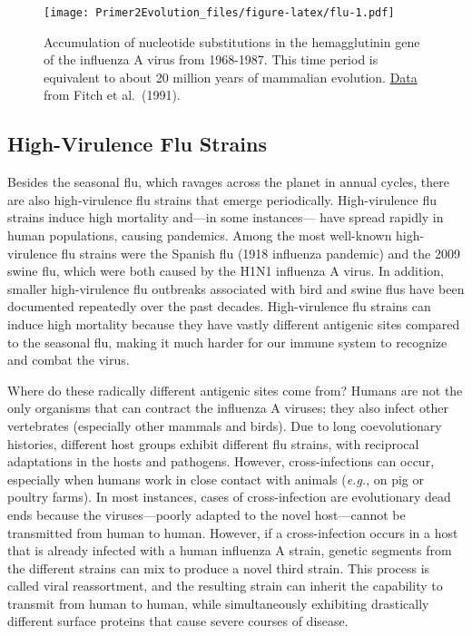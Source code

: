 \documentclass[
]{book}
\begin{document}
\begin{figure}
\centering
\texttt{[image: Primer2Evolution\_files/figure-latex/flu-1.pdf]}
\caption{\label{fig:flu}Accumulation of nucleotide substitutions in the hemagglutinin gene of the influenza A virus from 1968-1987. This time period is equivalent to about 20 million years of mammalian evolution. \href{data/7_influenza.csv}{Data} from Fitch et al.~(1991).}
\end{figure}

\hypertarget{high-virulence-flu-strains}{%
\subsection{High-Virulence Flu Strains}\label{high-virulence-flu-strains}}

Besides the seasonal flu, which ravages across the planet in annual cycles, there are also high-virulence flu strains that emerge periodically. High-virulence flu strains induce high mortality and---in some instances--- have spread rapidly in human populations, causing pandemics. Among the most well-known high-virulence flu strains were the Spanish flu (1918 influenza pandemic) and the 2009 swine flu, which were both caused by the H1N1 influenza A virus. In addition, smaller high-virulence flu outbreaks associated with bird and swine flus have been documented repeatedly over the past decades. High-virulence flu strains can induce high mortality because they have vastly different antigenic sites compared to the seasonal flu, making it much harder for our immune system to recognize and combat the virus.

Where do these radically different antigenic sites come from? Humans are not the only organisms that can contract the influenza A viruses; they also infect other vertebrates (especially other mammals and birds). Due to long coevolutionary histories, different host groups exhibit different flu strains, with reciprocal adaptations in the hosts and pathogens. However, cross-infections can occur, especially when humans work in close contact with animals (\emph{e.g.}, on pig or poultry farms). In most instances, cases of cross-infection are evolutionary dead ends because the viruses---poorly adapted to the novel host---cannot be transmitted from human to human. However, if a cross-infection occurs in a host that is already infected with a human influenza A strain, genetic segments from the different strains can mix to produce a novel third strain. This process is called viral reassortment, and the resulting strain can inherit the capability to transmit from human to human, while simultaneously exhibiting drastically different surface proteins that cause severe courses of disease.
\end{document}
